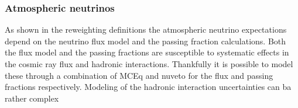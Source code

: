\subsubsection{Atmospheric neutrinos}
As shown in the reweighting definitions the atmospheric neutrino expectations depend on the neutrino flux model and the passing fraction calculations.
Both the flux model and the passing fractions are susceptible to systematic effects in the cosmic ray flux and hadronic interactions.
Thankfully it is possible to model these through a combination of MCEq and nuveto for the flux and passing fractions respectively.
Modeling of the hadronic interaction uncertainties can ba rather complex

